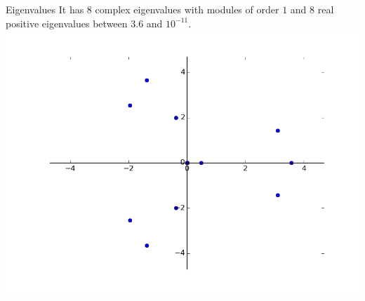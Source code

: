 \documentclass{beamer}
\theoremstyle{plain}
\theoremstyle{definition}
\theoremstyle{remark}
\begin{document}
\begin{frame}{Eigenvalues}
  It has $8$ complex eigenvalues with modules of order $1$ and $8$
  real positive eigenvalues between $3.6$ and $10^{-11}$.
  \includegraphics[width=\textwidth,height=\textheight]{"chebvand/eigs"}
\end{frame}
\end{document}
